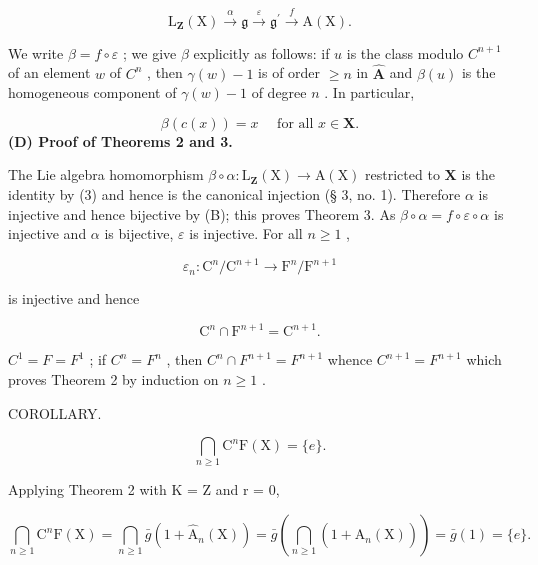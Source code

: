 \[
\mathrm{L} _ {\mathbf {Z}} (\mathrm{X}) \stackrel {{\alpha}} {{\longrightarrow}} \mathfrak {g} \stackrel {{\varepsilon}} {{\longrightarrow}} \mathfrak {g} ^ {\prime} \stackrel {{f}} {{\longrightarrow}} \mathrm{A} (\mathrm{X}).
\]

We write \(\beta = f\circ \varepsilon\) ; we give \(\beta\) explicitly as follows: if \(u\) is the class modulo \(C^{n + 1}\) of an element \(w\) of \(C^n\) , then \(\gamma (w) - 1\) is of order \(\geqslant n\) in \(\hat{\mathbf{A}}\) and \(\beta (u)\) is the homogeneous component of \(\gamma (w) - 1\) of degree \(n\) . In particular,

\[
\beta (c (x)) = x \quad \text { for   all } x \in \mathbf {X}.\tag{3}
\]
\relax{}
\textbf{(D) Proof of Theorems 2 and 3.}

The Lie algebra homomorphism \(\beta \circ \alpha: \mathrm{L}_{\mathbf{Z}}(\mathrm{X}) \to \mathrm{A}(\mathrm{X})\) restricted to \(\mathbf{X}\) is the identity by (3) and hence is the canonical injection (§ 3, no. 1). Therefore \(\alpha\) is injective and hence bijective by (B); this proves Theorem 3. As \(\beta \circ \alpha = f \circ \varepsilon \circ \alpha\) is injective and \(\alpha\) is bijective, \(\varepsilon\) is injective. For all \(n \geqslant 1\) ,

\[
\varepsilon_ {n} \colon \mathrm{C} ^ {n} / \mathrm{C} ^ {n + 1} \rightarrow \mathrm{F} ^ {n} / \mathrm{F} ^ {n + 1}
\]

is injective and hence

\[
\mathrm{C} ^ {n} \cap \mathrm{F} ^ {n + 1} = \mathrm{C} ^ {n + 1}.
\]

\(C^{1} = F = F^{1}\) ; if \(C^{n} = F^{n}\) , then \(C^{n} \cap F^{n+1} = F^{n+1}\) whence \(C^{n+1} = F^{n+1}\) which proves Theorem 2 by induction on \(n \geqslant 1\) .

COROLLARY.

\[
\bigcap_ {n \geqslant 1} \mathrm{C} ^ {n} \mathrm{F} (\mathrm{X}) = \{e \}.
\]

Applying Theorem 2 with K = Z and r = 0,

\[
\bigcap_ {n \geqslant 1} \mathrm{C} ^ {n} \mathrm{F} (\mathrm{X}) = \bigcap_ {n \geqslant 1} \bar {g} (1 + \hat {\mathrm{A}} _ {n} (\mathrm{X})) = \bar {g} \left(\bigcap_ {n \geqslant 1} (1 + \hat {\mathrm{A}} _ {n} (\mathrm{X}))\right) = \bar {g} (1) = \{e \}.
\]

